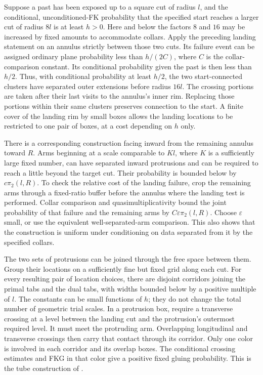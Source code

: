 Suppose a past has been exposed up to a square cut of radius $l$,
and the conditional, unconditioned-FK probability that the specified
start reaches a larger cut of radius $8l$ is at least $h>0$.
Here and below the factors $8$ and $16$ may be increased by fixed
amounts to accommodate collars.  Apply the preceding landing
statement on an annulus strictly between those two cuts.  Its
failure event can be assigned ordinary plane probability less than
$h/(2C)$, where $C$ is the collar-comparison constant.  Its
conditional probability given the past is then less than $h/2$.
Thus, with conditional probability at least $h/2$, the two
start-connected clusters have separated outer extensions before
radius $16l$.  The crossing portions are taken after their last
visits to the annulus's inner rim.  Replacing those portions within
their same clusters preserves connection to the start.  A finite
cover of the landing rim by small boxes allows the landing
locations to be restricted to one pair of boxes, at a cost depending
on $h$ only.

There is a corresponding construction facing inward from the
remaining annulus toward $R$.  Arms beginning at a scale comparable
to $K l$, where $K$ is a sufficiently large fixed number, can have
separated inward protrusions and can be required to reach a little
beyond the target cut.  Their probability is bounded below by
$c\pi_2(l,R)$.  To check the relative cost of the landing failure,
crop the remaining arms through a fixed-ratio buffer before the
annulus where the landing test is performed.  Collar comparison
and quasimultiplicativity bound the joint probability of that
failure and the remaining arms by
$C\varepsilon\pi_2(l,R)$.  Choose $\varepsilon$ small, or use the
equivalent well-separated-arm comparison.  This also shows that
the construction is uniform under conditioning on data separated
from it by the specified collars.

The two sets of protrusions can be joined through the free space
between them.  Group their locations on a sufficiently fine but
fixed grid along each cut.  For every resulting pair of location
choices, there are disjoint corridors joining the primal tabs and
the dual tabs, with widths bounded below by a positive multiple
of $l$.  The constants can be small functions of $h$; they do not
change the total number of geometric trial scales.  In a
protrusion box, require a transverse crossing at a level between
the landing cut and the protrusion's outermost required level.
It must meet the protruding arm.  Overlapping longitudinal and
transverse crossings then carry that contact through its corridor.
Only one color is involved in each corridor and its overlap boxes.
The conditional crossing estimates and FKG in that color give a
positive fixed gluing probability.  This is the tube construction
of \cite[Proof of Proposition~5.4]{CDCH}.

